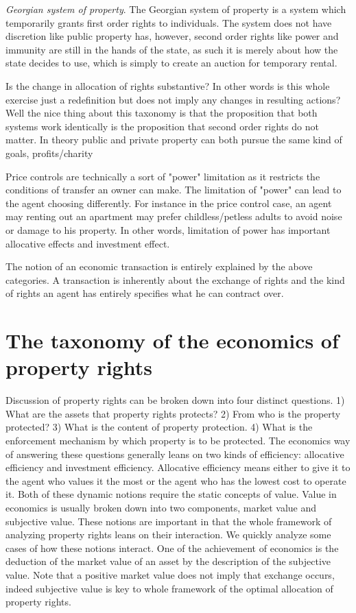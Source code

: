 \documentclass[12pt]{article}
\numberwithin{equation}{section}
\begin{document}
\textit{Georgian system of property}. The Georgian system of property is a system which temporarily grants first order rights to individuals. The system does not have discretion like public property has, however, second order rights like power and immunity are still in the hands of the state, as such it is merely about how the state decides to use, which is simply to create an auction for temporary rental.  

Is the change in allocation of rights substantive? In other words is this whole exercise just a redefinition but does not imply any changes in resulting actions? Well the nice thing about this taxonomy is that the proposition that both systems work identically is the proposition that second order rights do not matter. In theory public and private property can both pursue the same kind of goals, profits/charity


Price controls are technically a sort of "power" limitation as it restricts the conditions of transfer an owner can make. The limitation of "power" can lead to the agent choosing differently. For instance in the price control case, an agent may renting out an apartment may prefer childless/petless adults to avoid noise or damage to his property. In other words, limitation of power has important allocative effects and investment effect. 

The notion of an economic transaction is entirely explained by the above categories. A transaction is inherently about the exchange of rights and the kind of rights an agent has entirely specifies what he can contract over. 

\newpage
\section{The taxonomy of the economics of property rights}

Discussion of property rights can be broken down into four distinct questions. 1) What are the assets that property rights protects? 2) From who is the property protected? 3) What is the content of property protection. 4) What is the enforcement mechanism by which property is to be protected. The economics way of answering these questions generally leans on two kinds of efficiency: allocative efficiency and investment efficiency. Allocative efficiency means either to give it to the agent who values it the most or the agent who has the lowest cost to operate it. Both of these dynamic notions require the static concepts of value. Value in economics is usually broken down into two components, market value and subjective value. These notions are important in that the whole framework of analyzing property rights leans on their interaction. We quickly analyze some cases of how these notions interact. One of the achievement of economics is the deduction of the market value of an asset by the description of the subjective value. Note that a positive market value does not imply that exchange occurs, indeed subjective value is key to whole framework of the optimal allocation of property rights. 
\end{document}

